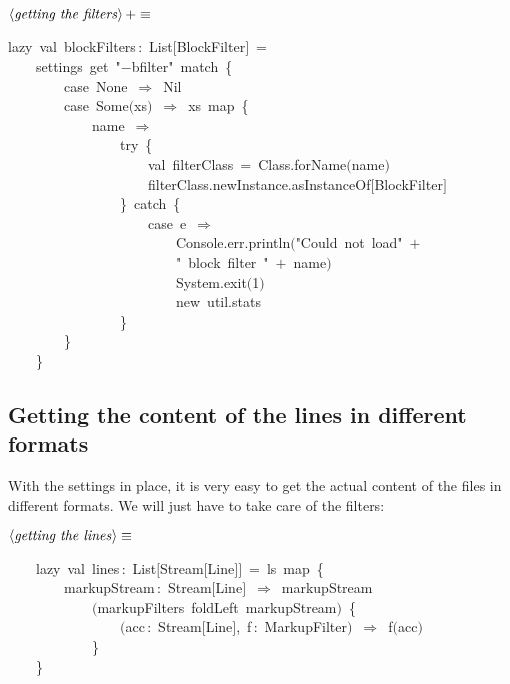 \documentclass[a4paper,12pt]{article}
\begin{document}
$\left<\mbox{\emph{getting the filters}}\right>+\equiv$
\begin{program}{\vem lazy}~{\vem val}~blockFilters\,{\rm :}~List$[$BlockFilter$]$~=
\\~~~~settings~get~"$-$bfilter"~{\vem match}~{\small\{}
\\~~~~~~~~{\vem case}~None~$\Rightarrow$~Nil
\\~~~~~~~~{\vem case}~Some$($xs$)$~$\Rightarrow$~xs~map~{\small\{}
\\~~~~~~~~~~~~name~$\Rightarrow$
\\~~~~~~~~~~~~~~~~{\vem try}~{\small\{}
\\~~~~~~~~~~~~~~~~~~~~{\vem val}~filterClass~=~Class.forName$($name$)$
\\~~~~~~~~~~~~~~~~~~~~filterClass.newInstance.asInstanceOf$[$BlockFilter$]$
\\~~~~~~~~~~~~~~~~{\small\}}~{\vem catch}~{\small\{}
\\~~~~~~~~~~~~~~~~~~~~{\vem case}~e~$\Rightarrow$
\\~~~~~~~~~~~~~~~~~~~~~~~~Console.err.println$($"Could~not~load"~$+$
\\~~~~~~~~~~~~~~~~~~~~~~~~"~block~filter~"~$+$~name$)$
\\~~~~~~~~~~~~~~~~~~~~~~~~System.exit$($1$)$
\\~~~~~~~~~~~~~~~~~~~~~~~~{\vem new}~util.stats
\\~~~~~~~~~~~~~~~~{\small\}}
\\~~~~~~~~{\small\}}
\\~~~~{\small\}}
\\[0.5em]\end{program}


\subsection{Getting the content of the lines in different formats}
With the settings in place, it is very easy to get the actual content
of the files in different formats. We will just have to take care of the
filters:

$\left<\mbox{\emph{getting the lines}}\right>\equiv$
\begin{program}~~~~{\vem lazy}~{\vem val}~lines\,{\rm :}~List$[$Stream$[$Line$]$$]$~=~ls~map~{\small\{}
\\~~~~~~~~markupStream\,{\rm :}~Stream$[$Line$]$~$\Rightarrow$~markupStream
\\~~~~~~~~~~~~$($markupFilters~foldLeft~markupStream$)$~{\small\{}
\\~~~~~~~~~~~~~~~~$($acc\,{\rm :}~Stream$[$Line$]$,~f\,{\rm :}~MarkupFilter$)$~$\Rightarrow$~f$($acc$)$
\\~~~~~~~~~~~~{\small\}}
\\~~~~{\small\}}
\\[0.5em]\end{program}
\end{document}
